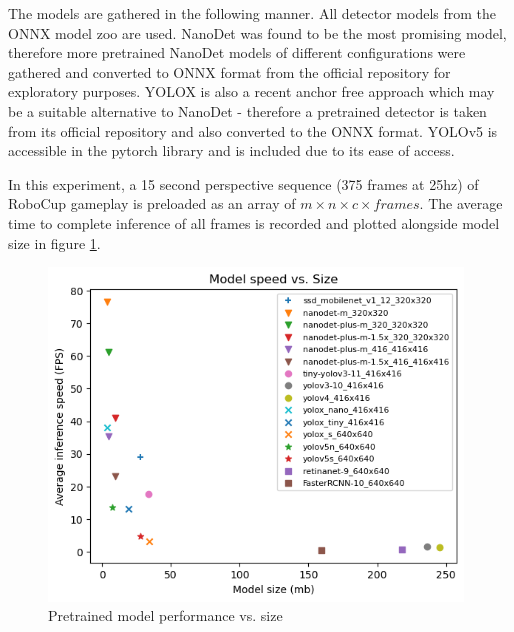 \documentclass[a4paper,twoside,12pt]{report}
\begin{document}
The models are gathered in the following manner. All detector models from the ONNX model zoo \cite{modelzoo} are used. NanoDet was found to be the most promising model, therefore more pretrained NanoDet models of different configurations were gathered and converted to ONNX format from the official repository for exploratory purposes. YOLOX \citep{yolox} is also a recent anchor free approach which may be a suitable alternative to NanoDet - therefore a pretrained detector is taken from its official repository \citep{yoloxrepo} and also converted to the ONNX format. YOLOv5 is accessible in the pytorch library and is included due to its ease of access. 

In this experiment, a 15 second perspective sequence (375 frames at 25hz) of RoboCup gameplay is preloaded as an array of $m \times n \times c \times frames$. The average time to complete inference of all frames is recorded and plotted alongside model size in figure \ref{fig:modelspeedsize}.

\begin{figure}[h!]
\begin{center}
\includegraphics[width=11cm]{images/modelspeedsize.png}
\caption{Pretrained model performance vs. size}
\label{fig:modelspeedsize}
\end{center}
\end{figure}
\end{document}
